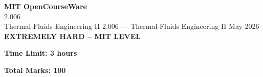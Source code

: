 \documentclass[12pt,a4paper]{exam}
\begin{document}
\begin{center}
{\LARGE \textbf{MIT OpenCourseWare}}\\2.006\\Thermal-Fluids Engineering II
\vspace{0.5cm}
{2.006} --- {Thermal-Fluids Engineering II}
\vspace{0.3cm}
May 2026
\vspace{0.3cm}
\textbf{EXTREMELY HARD -- MIT LEVEL}
\end{center}

\begin{center}
\textbf{Time Limit: 3 hours}
\end{center}

\begin{center}
\textbf{Total Marks: 100}
\end{center}

\vspace{0.5cm}
\end{document}
